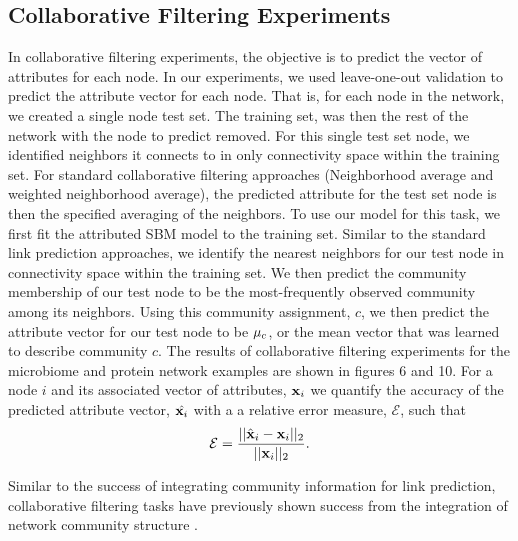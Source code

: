 \documentclass[journal]{IEEEtran}
\begin{document}
\subsection{Collaborative Filtering Experiments}
In collaborative filtering experiments, the objective is to predict the vector of attributes for each node. In our experiments, we used leave-one-out validation to predict the attribute vector for each node. That is, for each node in the network, we created a single node test set. The training set, was then the rest of the network with the node to predict removed. For this single test set node, we identified neighbors it connects to in only connectivity space within the training set. For standard collaborative filtering approaches (Neighborhood average and weighted neighborhood average), the predicted attribute for the test set node is then the specified averaging of the neighbors. To use our model for this task, we first fit the attributed SBM model to the training set. Similar to the standard link prediction approaches, we identify the nearest neighbors for our test node in connectivity space within the training set. We then predict the community membership of our test node to be the most-frequently observed community among its neighbors. Using this community assignment, $c$, we then predict the attribute vector for our test node to be ${\bf \mu}_{c}$, or the mean vector that was learned to describe community $c$. The results of collaborative filtering experiments for the microbiome and protein network examples are shown in figures 6 and 10. For a node $i$ and its associated vector of attributes, ${\bf x}_{i}$ we quantify the accuracy of the predicted attribute vector, $\hat{{\bf x}_{i}}$ with a a relative error measure, $\mathcal{E}$, such that 
\begin{equation}
\mathcal{E}=\frac{||\hat{\bf{x}}_{i}-{\bf x}_{i}||_{2}}{||{\bf x}_{i}||_{2}}.
\end{equation}

Similar to the success of integrating community information for link prediction, collaborative filtering tasks have previously shown success from the integration of network community structure \cite{collabComm}. 
\end{document}
